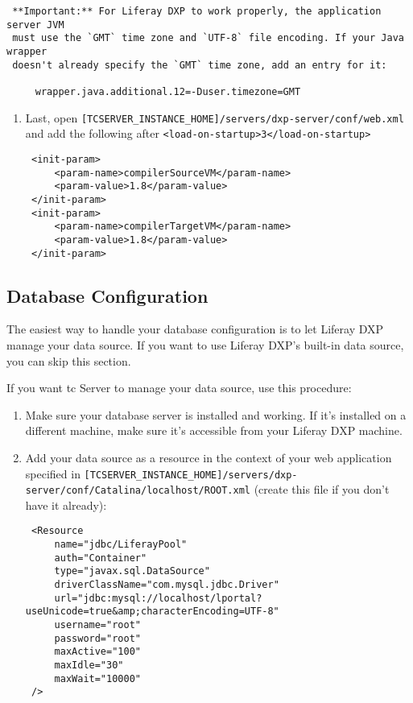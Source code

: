 \noindent\hrulefill

\begin{verbatim}
 **Important:** For Liferay DXP to work properly, the application server JVM
 must use the `GMT` time zone and `UTF-8` file encoding. If your Java wrapper
 doesn't already specify the `GMT` time zone, add an entry for it:
 
     wrapper.java.additional.12=-Duser.timezone=GMT
\end{verbatim}

\noindent\hrulefill

\begin{enumerate}
\def\labelenumi{\arabic{enumi}.}
\setcounter{enumi}{3}
\item
  Last, open
  \texttt{{[}TCSERVER\_INSTANCE\_HOME{]}/servers/dxp-server/conf/web.xml}
  and add the following after
  \texttt{\textless{}load-on-startup\textgreater{}3\textless{}/load-on-startup\textgreater{}}

\begin{verbatim}
 <init-param>
     <param-name>compilerSourceVM</param-name>
     <param-value>1.8</param-value>
 </init-param>
 <init-param>
     <param-name>compilerTargetVM</param-name>
     <param-value>1.8</param-value>
 </init-param> 
\end{verbatim}
\end{enumerate}

\subsection{Database Configuration}\label{database-configuration-2}

The easiest way to handle your database configuration is to let Liferay
DXP manage your data source. If you want to use Liferay DXP's built-in
data source, you can skip this section.

If you want tc Server to manage your data source, use this procedure:

\begin{enumerate}
\def\labelenumi{\arabic{enumi}.}
\item
  Make sure your database server is installed and working. If it's
  installed on a different machine, make sure it's accessible from your
  Liferay DXP machine.
\item
  Add your data source as a resource in the context of your web
  application specified in
  \texttt{{[}TCSERVER\_INSTANCE\_HOME{]}/servers/dxp-server/conf/Catalina/localhost/ROOT.xml}
  (create this file if you don't have it already):

\begin{verbatim}
 <Resource
     name="jdbc/LiferayPool"
     auth="Container"
     type="javax.sql.DataSource"
     driverClassName="com.mysql.jdbc.Driver"
     url="jdbc:mysql://localhost/lportal?useUnicode=true&amp;characterEncoding=UTF-8"
     username="root"
     password="root"
     maxActive="100"
     maxIdle="30"
     maxWait="10000"
 />
\end{verbatim}
\end{enumerate}

